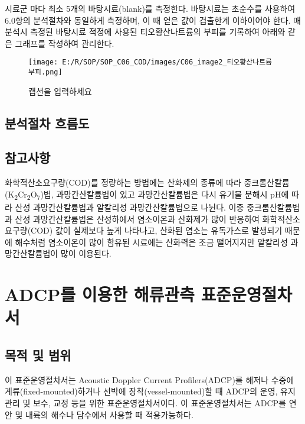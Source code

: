 \documentclass[
]{book}
\begin{document}
시료군 마다 최소 5개의 바탕시료(blank)를 측정한다. 바탕시료는 초순수를 사용하여 6.0항의 분석절차와 동일하게 측정하며, 이 때 얻은 값이 검출한계 이하이어야 한다. 매 분석시 측정된 바탕시료 적정에 사용된 티오황산나트륨의 부피를 기록하여 아래와 같은 그래프를 작성하여 관리한다.

\begin{figure}
\centering
\texttt{[image: E:/R/SOP/SOP\_C06\_COD/images/C06\_image2\_티오황산나트륨 부피.png]}
\caption{캡션을 입력하세요}
\end{figure}

\hypertarget{uxbd84uxc11duxc808uxcc28-uxd750uxb984uxb3c4}{%
\section{분석절차 흐름도}\label{uxbd84uxc11duxc808uxcc28-uxd750uxb984uxb3c4}}

\hypertarget{uxcc38uxace0uxc0acuxd56d}{%
\section{참고사항}\label{uxcc38uxace0uxc0acuxd56d}}

화학적산소요구량(COD)를 정량하는 방법에는 산화제의 종류에 따라 중크롬산칼륨(K\textsubscript{2}Cr\textsubscript{2}O\textsubscript{7})법, 과망간산칼륨법이 있고 과망간산칼륨법은 다시 유기물 분해시 pH에 따라 산성 과망간산칼륨법과 알칼리성 과망간산칼륨법으로 나뉜다. 이중 중크롬산칼륨법과 산성 과망간산칼륨법은 산성하에서 염소이온과 산화제가 많이 반응하여 화학적산소요구량(COD) 값이 실제보다 높게 나타나고, 산화된 염소는 유독가스로 발생되기 때문에 해수처럼 염소이온이 많이 함유된 시료에는 산화력은 조금 떨어지지만 알칼리성 과망간산칼륨법이 많이 이용된다.

\hypertarget{adcpuxb97c-uxc774uxc6a9uxd55c-uxd574uxb958uxad00uxce21-uxd45cuxc900uxc6b4uxc601uxc808uxcc28uxc11c}{%
\chapter{ADCP를 이용한 해류관측 표준운영절차서}\label{adcpuxb97c-uxc774uxc6a9uxd55c-uxd574uxb958uxad00uxce21-uxd45cuxc900uxc6b4uxc601uxc808uxcc28uxc11c}}

\hypertarget{uxbaa9uxc801-uxbc0f-uxbc94uxc704-3}{%
\section{목적 및 범위}\label{uxbaa9uxc801-uxbc0f-uxbc94uxc704-3}}

이 표준운영절차서는 Acoustic Doppler Current Profilers(ADCP)를 해저나 수중에 계류(fixed-mounted)하거나 선박에 장착(vessel-mounted)할 때 ADCP의 운영, 유지관리 및 보수, 교정 등을 위한 표준운영절차서이다. 이 표준운영절차서는 ADCP를 연안 및 내륙의 해수나 담수에서 사용할 때 적용가능하다.
\end{document}
